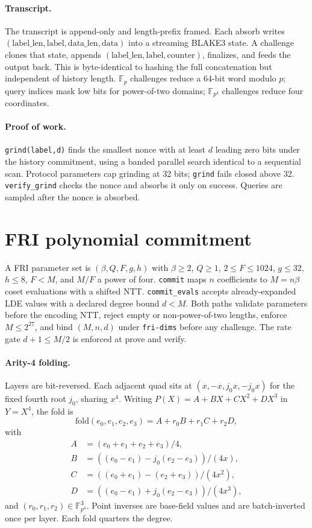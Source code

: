 \documentclass[11pt,a4paper]{article}
\newcommand{\wFp}{\mathbb{F}_p}
\newcommand{\wFpFour}{\mathbb{F}_{p^4}}
\newcommand{\wFold}{\mathrm{fold}}
\begin{document}
\paragraph{Transcript.} The transcript is append-only and length-prefix
framed. Each absorb writes
$(\text{label\_len},\text{label},\text{data\_len},\text{data})$ into a
streaming BLAKE3 state. A challenge clones that state, appends
$(\text{label\_len},\text{label},\text{counter})$, finalizes, and feeds the
output back. This is byte-identical to hashing the full concatenation but
independent of history length. $\wFp$ challenges reduce a 64-bit word modulo
$p$; query indices mask low bits for power-of-two domains; $\wFpFour$
challenges reduce four coordinates.

\paragraph{Proof of work.} \texttt{grind(label,d)} finds the smallest nonce
with at least $d$ leading zero bits under the history commitment, using a
banded parallel search identical to a sequential scan. Protocol parameters
cap grinding at 32 bits; \texttt{grind} fails closed above 32.
\texttt{verify\_grind} checks the nonce and absorbs it only on success.
Queries are sampled after the nonce is absorbed.

\section{FRI polynomial commitment}

A FRI parameter set is $(\beta,Q,F,g,h)$ with $\beta\ge2$, $Q\ge1$,
$2\le F\le1024$, $g\le32$, $h\le8$, $F<M$, and $M/F$ a power of four.
\texttt{commit} maps $n$ coefficients to $M=n\beta$ coset evaluations with a
shifted NTT. \texttt{commit\_evals} accepts already-expanded LDE values with
a declared degree bound $d<M$. Both paths validate parameters before the
encoding NTT, reject empty or non-power-of-two lengths, enforce $M\le2^{27}$,
and bind $(M,n,d)$ under \texttt{fri-dims} before any challenge. The rate gate
$d+1\le M/2$ is enforced at prove and verify.

\paragraph{Arity-4 folding.} Layers are bit-reversed. Each adjacent quad sits
at $(x,-x,j_0x,-j_0x)$ for the fixed fourth root $j_0$, sharing $x^4$.
Writing $P(X)=A+BX+CX^2+DX^3$ in $Y=X^4$, the fold is
\[
\wFold(e_0,e_1,e_2,e_3)=A+r_0B+r_1C+r_2D,
\]
with
\[
\begin{aligned}
A&=(e_0+e_1+e_2+e_3)/4,\\
B&=((e_0-e_1)-j_0(e_2-e_3))/(4x),\\
C&=((e_0+e_1)-(e_2+e_3))/(4x^2),\\
D&=((e_0-e_1)+j_0(e_2-e_3))/(4x^3),
\end{aligned}
\]
and $(r_0,r_1,r_2)\in\wFpFour^3$. Point inverses are base-field values and
are batch-inverted once per layer. Each fold quarters the degree.
\end{document}
